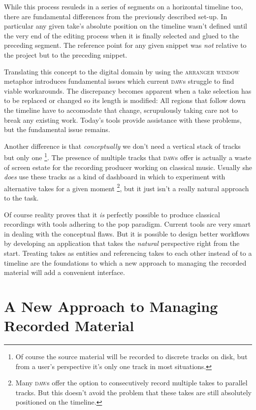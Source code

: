 \documentclass[11pt,a4paper]{article}
\newcommand*{\term}[1]{\textsc{#1}}
\begin{document}
While this process resuleds in a series of segments on a horizontal timeline too,
there are fundamental differences from the previously described set-up.
In particular any given take's absolute position on the timeline wasn't defined until the
very end of the editing process when it is finally selected and glued to the
preceding segment.
The reference point for any given snippet was \emph{not} relative to the project
but to the preceding snippet.

Translating this concept to the digital domain by using the \term{arranger window}
metaphor introduces fundamental issues which current \textsc{daw}s struggle to find
viable workarounds.
The discrepancy becomes apparent when a take selection has to be replaced or changed
so its length is modified: All regions that follow down the timeline have
to accomodate that change, scrupulously taking care not to break any existing work.
Today's tools provide assistance with these problems, but the fundamental
issue remains.

Another difference is that \emph{conceptually} we don't need a vertical stack of
tracks but only one%
\footnote{Of course the source material will be recorded to discrete tracks on
disk, but from a user's perspective it's only one track in most situations.}.
The presence of multiple tracks that \textsc{daw}s offer is actually a waste of
screen estate for the recording producer working on classical music.
Usually she \emph{does} use these tracks as a kind of dashboard in which to
experiment with alternative takes for a given moment%
\footnote{Many \textsc{daw}s offer the option to consecutively record multiple
takes to parallel tracks. But this doesn't avoid the problem that these takes
are still absolutely positioned on the timeline.}, but it just isn't a really
natural approach to the task.

Of course reality proves that it \emph{is} perfectly possible to produce classical
recordings with tools adhering to the pop paradigm. Current tools are very
smart in dealing with the conceptual flaws.
But it is possible to design better workflows by developing an application that
takes the \emph{natural} perspective right from the start.
Treating takes as entities and referencing takes to each other instead of to a
timeline are the foundations to which a new approach to managing the recorded
material will add a convenient interface.


\section{A New Approach to Managing Recorded Material}
\end{document}
